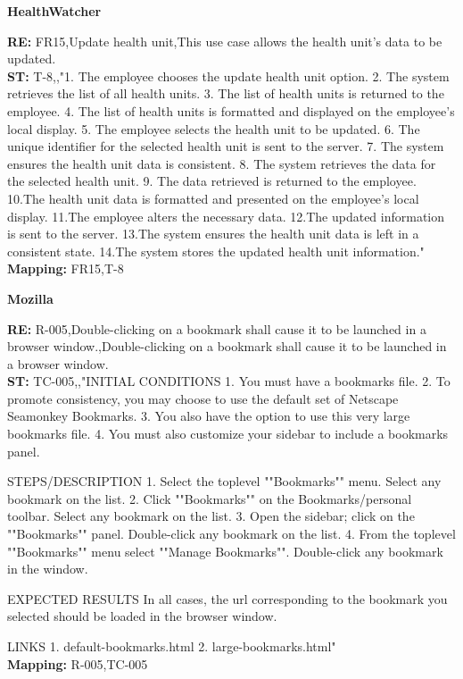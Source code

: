 \documentclass[conference]{IEEEtran}
\begin{document}
\hspace{1.5em}\textbf{HealthWatcher}
\begin{roundedBox-sm}
    \textbf{RE:} FR15,Update health unit,This use case allows the health unit's data to be updated.
    \\[0.5em]
    \textbf{ST:} T-8,,"1. The employee chooses the update health unit option.
2. The system retrieves the list of all health units.
3. The list of health units is returned to the employee.
4. The list of health units is formatted and displayed on the employee’s local display.
5. The employee selects the health unit to be updated.
6. The unique identifier for the selected health unit is sent to the server.
7. The system ensures the health unit data is consistent.
8. The system retrieves the data for the selected health unit.
9. The data retrieved is returned to the employee.
10.The health unit data is formatted and presented on the employee’s local display.
11.The employee alters the necessary data.
12.The updated information is sent to the server.
13.The system ensures the health unit data is left in a consistent state. 
14.The system stores the updated health unit information."
    \\[0.5em]
    \textbf{Mapping:} FR15,T-8
\end{roundedBox-sm}

\hspace{1.5em}\textbf{Mozilla}

\begin{roundedBox-sm}
    \textbf{RE:} R-005,Double-clicking on a bookmark shall cause it to be launched in a browser window.,Double-clicking on a bookmark shall cause it to be launched in a browser window.
    \\[0.5em]
    \textbf{ST:}
    TC-005,,"INITIAL CONDITIONS
    1. You must have a bookmarks file.
    2. To promote consistency, you may choose to use the default set of Netscape Seamonkey Bookmarks.
    3. You also have the option to use this very large bookmarks file.
    4. You must also customize your sidebar to include a bookmarks panel.
    
    STEPS/DESCRIPTION
    1. Select the toplevel ""Bookmarks"" menu. Select any bookmark on the list.
    2. Click ""Bookmarks"" on the Bookmarks/personal toolbar. Select any bookmark on the list.
    3. Open the sidebar; click on the ""Bookmarks"" panel. Double-click any bookmark on the list.
    4. From the toplevel ""Bookmarks"" menu select ""Manage Bookmarks"". Double-click any bookmark in the window.
    
    EXPECTED RESULTS
    In all cases, the url corresponding to the bookmark you selected should be loaded in the browser window.
    
    LINKS
    1. default-bookmarks.html
    2. large-bookmarks.html"
    \\[0.5em]
    \textbf{Mapping:} R-005,TC-005
\end{roundedBox-sm}
\end{document}
